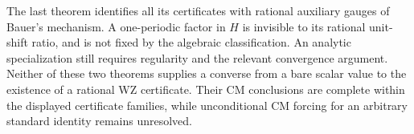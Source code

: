 The last theorem identifies all its certificates with rational
auxiliary gauges of Bauer's mechanism.  A one-periodic factor in
$H$ is invisible to its rational unit-shift ratio, and is not fixed
by the algebraic classification.  An analytic specialization still
requires regularity and the relevant convergence argument.  Neither
of these two theorems supplies a converse from a bare scalar value
to the existence of a rational WZ certificate.  Their CM conclusions
are complete within the displayed certificate families, while
unconditional CM forcing for an arbitrary standard identity remains
unresolved.

